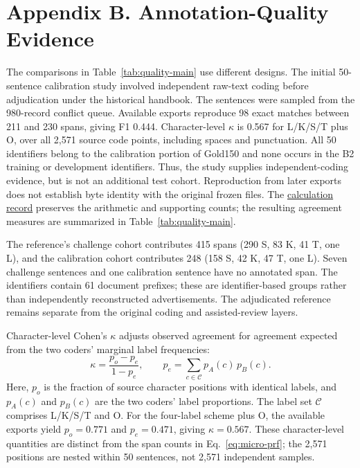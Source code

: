 \section{Appendix B. Annotation-Quality Evidence}
\label{app:b}
\label{sec:quality-provenance-r12}
The comparisons in Table~\ref{tab:quality-main} use different designs. The initial 50-sentence calibration study involved independent raw-text coding before adjudication under the historical handbook. The sentences were sampled from the 980-record conflict queue. Available exports reproduce 98 exact matches between 211 and 230 spans, giving F1 0.444. Character-level $\kappa$ is 0.567 for L/K/S/T plus O, over all 2,571 source code points, including spaces and punctuation. All 50 identifiers belong to the calibration portion of Gold150 and none occurs in the B2 training or development identifiers. Thus, the study supplies independent-coding evidence, but is not an additional test cohort. Reproduction from later exports does not establish byte identity with the original frozen files. The \href{https://github.com/AlfredJamesLi/chinese-skillspan-benchmark/blob/1d1c24e20ee049fc768034b5baf58fa882e08e2c/reproduction/process_archive_20260924/secondary_review/tables/iaa50.tex}{calculation record} preserves the arithmetic and supporting counts; the resulting agreement measures are summarized in Table~\ref{tab:quality-main}.

The reference's challenge cohort contributes 415 spans (290 S, 83 K, 41 T, one L), and the calibration cohort contributes 248 (158 S, 42 K, 47 T, one L). Seven challenge sentences and one calibration sentence have no annotated span. The identifiers contain 61 document prefixes; these are identifier-based groups rather than independently reconstructed advertisements. The adjudicated reference remains separate from the original coding and assisted-review layers.

Character-level Cohen's $\kappa$ adjusts observed agreement for agreement expected from the two coders' marginal label frequencies:
\begin{equation}
\kappa=\frac{p_o-p_e}{1-p_e},
\qquad p_e=\sum_{c\in\mathcal{C}}p_A(c)\,p_B(c).
\label{eq:character-kappa}
\end{equation}
Here, $p_o$ is the fraction of source character positions with identical labels, and $p_A(c)$ and $p_B(c)$ are the two coders' label proportions. The label set $\mathcal{C}$ comprises L/K/S/T and O. For the four-label scheme plus O, the available exports yield $p_o=0.771$ and $p_e=0.471$, giving $\kappa=0.567$. These character-level quantities are distinct from the span counts in Eq.~\eqref{eq:micro-prf}; the 2,571 positions are nested within 50 sentences, not 2,571 independent samples.

